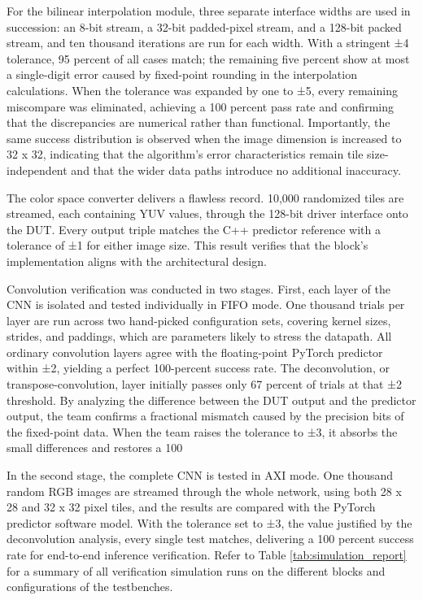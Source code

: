 \documentclass{article}
\begin{document}
    \par For the bilinear interpolation module, three separate interface widths are used in succession: an 8-bit stream, a 32-bit padded-pixel stream, and a 128-bit packed stream, and ten thousand iterations are run for each width. With a stringent ±4 tolerance, 95 percent of all cases match; the remaining five percent show at most a single-digit error caused by fixed-point rounding in the interpolation calculations. When the tolerance was expanded by one to ±5, every remaining miscompare was eliminated, achieving a 100 percent pass rate and confirming that the discrepancies are numerical rather than functional. Importantly, the same success distribution is observed when the image dimension is increased to 32 x 32, indicating that the algorithm’s error characteristics remain tile size-independent and that the wider data paths introduce no additional inaccuracy.

    \par The color space converter delivers a flawless record. 10,000 randomized tiles are streamed, each containing YUV values, through the 128-bit driver interface onto the DUT. Every output triple matches the C++ predictor reference with a tolerance of ±1 for either image size. This result verifies that the block’s implementation aligns with the architectural design.

    \par Convolution verification was conducted in two stages. First, each layer of the CNN is isolated and tested individually in FIFO mode. One thousand trials per layer are run across two hand-picked configuration sets, covering kernel sizes, strides, and paddings, which are parameters likely to stress the datapath. All ordinary convolution layers agree with the floating-point PyTorch predictor within ±2, yielding a perfect 100-percent success rate. The deconvolution, or transpose-convolution, layer initially passes only 67 percent of trials at that ±2 threshold. By analyzing the difference between the DUT output and the predictor output, the team confirms a fractional mismatch caused by the precision bits of the fixed-point data. When the team raises the tolerance to ±3, it absorbs the small differences and restores a 100%

    \par In the second stage, the complete CNN is tested in AXI mode. One thousand random RGB images are streamed through the whole network, using both 28 x 28 and 32 x 32 pixel tiles, and the results are compared with the PyTorch predictor software model. With the tolerance set to ±3, the value justified by the deconvolution analysis, every single test matches, delivering a 100 percent success rate for end-to-end inference verification. Refer to Table \ref{tab:simulation_report} for a summary of all verification simulation runs on the different blocks and configurations of the testbenches. 
\end{document}
